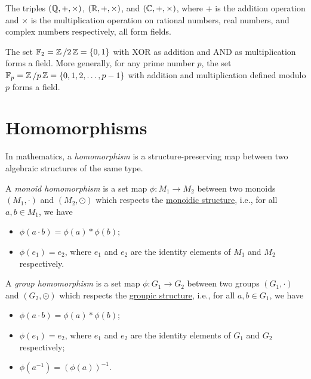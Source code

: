 \begin{example}
  The triples $(\operatorname{\mathbb{Q}}, +, \times)$, $(\operatorname{\mathbb{R}}, +, \times)$, and $(\operatorname{\mathbb{C}}, +, \times)$, where $+$ is the addition operation and $\times$ is the multiplication operation on rational numbers, real numbers, and complex numbers respectively, all form fields.
\end{example}

\begin{example}
  The set $\operatorname{\mathbb{F}}_2 = \operatorname{\mathbb{Z}} / 2\operatorname{\mathbb{Z}} = \{ 0, 1 \}$ with XOR as addition and AND as multiplication forms a field. More generally, for any prime number $p$, the set $\operatorname{\mathbb{F}}_p = \operatorname{\mathbb{Z}} / p\operatorname{\mathbb{Z}} = \{ 0, 1, 2, \ldots, p-1 \}$ with addition and multiplication defined modulo $p$ forms a field.
\end{example}

\section{Homomorphisms}

In mathematics, a \emph{homomorphism} is a structure-preserving map between two algebraic structures of the same type.

\begin{definition}\label{def:monoid_homomorphism}
  A \emph{monoid homomorphism} is a set map $\phi \colon M_1 \to M_2$ between two monoids $(M_1, \cdot)$ and $(M_2, \odot)$ which respects the \hyperref[def:monoidic_structure]{monoidic structure}, i.e., for all $a, b \in M_1$, we have
  \begin{itemize}
    \item $\phi(a \cdot b) = \phi(a) * \phi(b)$;
    \item $\phi(e_1) = e_2$, where $e_1$ and $e_2$ are the identity elements of $M_1$ and $M_2$ respectively.
  \end{itemize}
\end{definition}

\begin{definition}\label{def:group_homomorphism}
  A \emph{group homomorphism} is a set map $\phi \colon G_1 \to G_2$ between two groups $(G_1, \cdot)$ and $(G_2, \odot)$ which respects the \hyperref[def:groupic_structure]{groupic structure}, i.e., for all $a, b \in G_1$, we have
  \begin{itemize}
    \item $\phi(a \cdot b) = \phi(a) * \phi(b)$;
    \item $\phi(e_1) = e_2$, where $e_1$ and $e_2$ are the identity elements of $G_1$ and $G_2$ respectively;
    \item $\phi(a^{-1}) = {(\phi(a))}^{-1}$.
  \end{itemize}
\end{definition}


